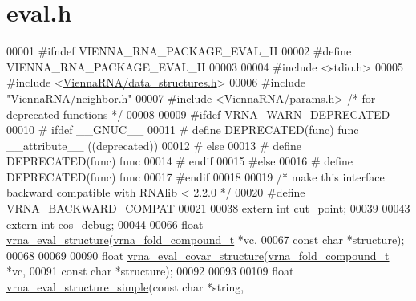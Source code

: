 \hypertarget{eval_8h_source}{}\section{eval.\+h}
\label{eval_8h_source}

\begin{DoxyCode}
00001 \textcolor{preprocessor}{#ifndef VIENNA\_RNA\_PACKAGE\_EVAL\_H}
00002 \textcolor{preprocessor}{#define VIENNA\_RNA\_PACKAGE\_EVAL\_H}
00003 
00004 \textcolor{preprocessor}{#include <stdio.h>}
00005 \textcolor{preprocessor}{#include <\hyperlink{data__structures_8h}{ViennaRNA/data\_structures.h}>}
00006 \textcolor{preprocessor}{#include "\hyperlink{neighbor_8h}{ViennaRNA/neighbor.h}"}
00007 \textcolor{preprocessor}{#include <\hyperlink{params_8h}{ViennaRNA/params.h}>}   \textcolor{comment}{/* for deprecated functions */}
00008 
00009 \textcolor{preprocessor}{#ifdef VRNA\_WARN\_DEPRECATED}
00010 \textcolor{preprocessor}{# ifdef \_\_GNUC\_\_}
00011 \textcolor{preprocessor}{#  define DEPRECATED(func) func \_\_attribute\_\_ ((deprecated))}
00012 \textcolor{preprocessor}{# else}
00013 \textcolor{preprocessor}{#  define DEPRECATED(func) func}
00014 \textcolor{preprocessor}{# endif}
00015 \textcolor{preprocessor}{#else}
00016 \textcolor{preprocessor}{# define DEPRECATED(func) func}
00017 \textcolor{preprocessor}{#endif}
00018 
00019 \textcolor{comment}{/* make this interface backward compatible with RNAlib < 2.2.0 */}
00020 \textcolor{preprocessor}{#define VRNA\_BACKWARD\_COMPAT}
00021 
00038 \textcolor{keyword}{extern} \textcolor{keywordtype}{int}  \hyperlink{group__eval_gab9b2c3a37a5516614c06d0ab54b97cda}{cut\_point};
00039 
00043 \textcolor{keyword}{extern} \textcolor{keywordtype}{int}  \hyperlink{group__eval_ga567530678f6260a1a649a5beca5da4c5}{eos\_debug};
00044 
00066 \textcolor{keywordtype}{float} \hyperlink{group__eval_ga58f199f1438d794a265f3b27fc8ea631}{vrna\_eval\_structure}(\hyperlink{group__fold__compound_structvrna__fc__s}{vrna\_fold\_compound\_t}  *vc,
00067                           \textcolor{keyword}{const} \textcolor{keywordtype}{char}            *structure);
00068 
00069 
00090 \textcolor{keywordtype}{float} \hyperlink{group__eval_ga6cea75c0eb9857fb59172be54cab09e0}{vrna\_eval\_covar\_structure}(\hyperlink{group__fold__compound_structvrna__fc__s}{vrna\_fold\_compound\_t}  *vc,
00091                                 \textcolor{keyword}{const} \textcolor{keywordtype}{char}            *structure);
00092 
00093 
00109 \textcolor{keywordtype}{float} \hyperlink{group__eval_gab6930f446d04761454d033680fbf7909}{vrna\_eval\_structure\_simple}(\textcolor{keyword}{const} \textcolor{keywordtype}{char} *\textcolor{keywordtype}{string},

\end{DoxyCode}
